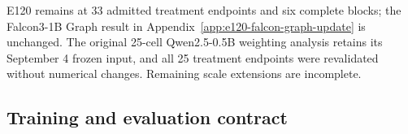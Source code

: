 \documentclass{article}
\newcommand{\1}{\mathbf 1}
\theoremstyle{remark}
\theoremstyle{definition}
\theoremstyle{plain}
\begin{document}
\begin{table}[H]
  \centering
  \caption{\textbf{Newly completed Level-2 Python and MathIR replay effects.}
  Each contrast uses all five registered seeds, 43--47, at pass 8.
  ReplayMaxRL is compared with MaxRL; ReplayDr.GRPO with Dr.GRPO.
  Entries give the paired mean and unadjusted 95\% Student-$t$ interval.
  Extra modes are \texttt{distinct@8}$-$\texttt{pass@8}; their effect remains
  coupled to correctness.}
  \label{tab:latest-completed-effects}
  \scriptsize
  \setlength{\tabcolsep}{3pt}
\end{table}

E120 remains at 33 admitted treatment endpoints and six complete blocks;
the Falcon3-1B Graph result in Appendix~\ref{app:e120-falcon-graph-update}
is unchanged. The original 25-cell Qwen2.5-0.5B weighting analysis retains its
September 4 frozen input, and all 25 treatment endpoints were revalidated
without numerical changes. Remaining scale extensions are incomplete.


\subsection{Training and evaluation contract}
\label{app:repro-run-contract}
\end{document}
